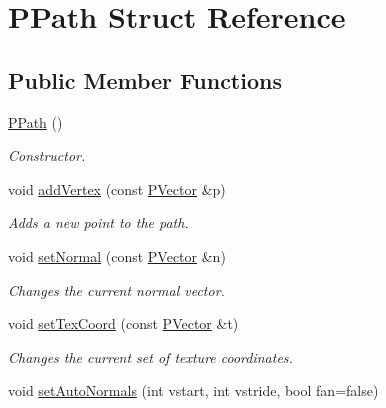 \hypertarget{structPPath}{\section{\-P\-Path \-Struct \-Reference}
\label{structPPath}
}
\subsection*{\-Public \-Member \-Functions}
\begin{DoxyCompactItemize}
\item 
\hyperlink{structPPath_af5405f463517c45459e647cd1f834798}{\-P\-Path} ()
\begin{DoxyCompactList}\small\item\em \-Constructor. \end{DoxyCompactList}\item 
void \hyperlink{structPPath_a929f642a8a8bf341f0070643c0ff757b}{add\-Vertex} (const \hyperlink{classcprocessing_1_1PVector}{\-P\-Vector} \&p)
\begin{DoxyCompactList}\small\item\em \-Adds a new point to the path. \end{DoxyCompactList}\item 
void \hyperlink{structPPath_a3cc19cb2b196178f4572f3f7f4efb90b}{set\-Normal} (const \hyperlink{classcprocessing_1_1PVector}{\-P\-Vector} \&n)
\begin{DoxyCompactList}\small\item\em \-Changes the current normal vector. \end{DoxyCompactList}\item 
void \hyperlink{structPPath_aae2a000ee4997dd8ec357d726f3181c1}{set\-Tex\-Coord} (const \hyperlink{classcprocessing_1_1PVector}{\-P\-Vector} \&t)
\begin{DoxyCompactList}\small\item\em \-Changes the current set of texture coordinates. \end{DoxyCompactList}\item 
void \hyperlink{structPPath_a9564ae60ad10d168e5882f12b33c0170}{set\-Auto\-Normals} (int vstart, int vstride, bool fan=false)
\end{DoxyCompactItemize}
